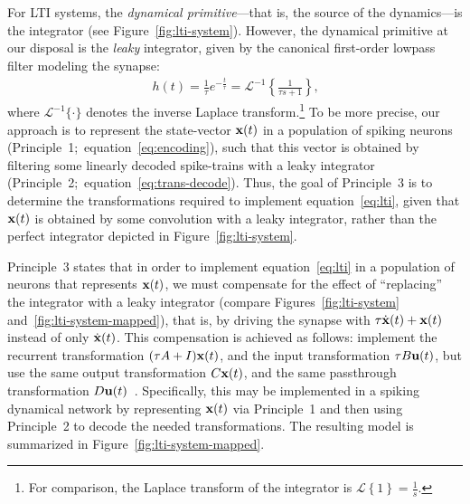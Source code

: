 For LTI systems, the \emph{dynamical primitive}---that is, the source of the dynamics---is the integrator (see Figure~\ref{fig:lti-system}).
However, the dynamical primitive at our disposal is the \emph{leaky} integrator, given by the canonical first-order lowpass filter modeling the synapse:
\begin{align} \label{eq:lowpass}
h(t) = \frac{1}{\tau} e^{-\frac{t}{\tau}} = \mathcal{L}^{-1}\left\{ \frac{1}{\tau s + 1} \right\} \text{,}
\end{align}
where $\mathcal{L}^{-1}\{ \cdot \}$ denotes the inverse Laplace transform.\footnote{
For comparison, the Laplace transform of the integrator is $\mathcal{L}\left\{ 1 \right\} = \frac{1}{s}$.}
To be more precise, our approach is to represent the state-vector $\mathbf{x}(t)$ in a population of spiking neurons (Principle~1;~equation~\ref{eq:encoding}), such that this vector is obtained by filtering some linearly decoded spike-trains with a leaky integrator (Principle~2;~equation~\ref{eq:trans-decode}).
Thus, the goal of Principle~3 is to determine the transformations required to implement equation~\ref{eq:lti}, given that $\mathbf{x}(t)$ is obtained by some convolution with a leaky integrator, rather than the perfect integrator depicted in Figure~\ref{fig:lti-system}.

Principle~3 states that in order to implement equation~\ref{eq:lti} in a population of neurons that represents $\mathbf{x}(t)$, we must compensate for the effect of ``replacing'' the integrator with a leaky integrator (compare Figures~\ref{fig:lti-system} and~\ref{fig:lti-system-mapped}), that is, by driving the synapse with $\tau \dot{\mathbf{x}}(t) + \mathbf{x}(t)$ instead of only $\dot{\mathbf{x}}(t)$.
This compensation is achieved as follows: implement the recurrent transformation $(\tau A + I)\mathbf{x}(t)$, and the input transformation $\tau B \mathbf{u}(t)$, but use the same output transformation $C\mathbf{x}(t)$, and the same passthrough transformation $D\mathbf{u}(t)$~\citep[][pp.~221--225]{eliasmith2003a}.
Specifically, this may be implemented in a spiking dynamical network by representing $\mathbf{x}(t)$ via Principle~1 and then using Principle~2 to decode the needed transformations.
The resulting model is summarized in Figure~\ref{fig:lti-system-mapped}.

